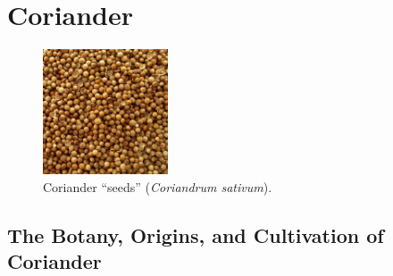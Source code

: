 \section{Coriander}
\label{sec:coriander}




\begin{figure}
	\vspace{-\baselineskip}
	\includegraphics[width=0.33\textwidth]{imgs/spices/coriander-1.jpg}
	\caption{Coriander ``seeds'' (\textit{Coriandrum sativum}).}
	\label{fig:coriander}
\end{figure}



\subsection{The Botany, Origins, and Cultivation of Coriander}


